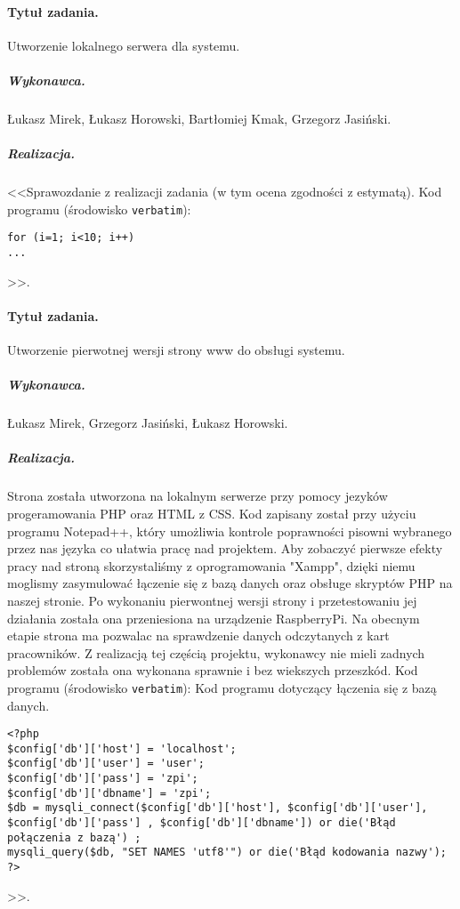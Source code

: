 \documentclass[a4paper]{article}
\begin{document}
\paragraph{Tytuł zadania.} Utworzenie lokalnego serwera dla systemu.
\subparagraph{Wykonawca.} Łukasz Mirek, Łukasz Horowski, Bartłomiej Kmak, Grzegorz Jasiński.
\subparagraph{Realizacja.} <<Sprawozdanie z realizacji zadania (w tym ocena zgodności z estymatą). Kod programu (środowisko \texttt{verbatim}): \begin{verbatim}
for (i=1; i<10; i++)
...
\end{verbatim}>>.
 
\paragraph{Tytuł zadania.} Utworzenie pierwotnej wersji strony www do obsługi systemu.
\subparagraph{Wykonawca.} Łukasz Mirek, Grzegorz Jasiński, Łukasz Horowski.
\subparagraph{Realizacja.} Strona została utworzona na lokalnym serwerze przy pomocy jezyków progeramowania PHP oraz HTML z CSS. Kod zapisany został przy użyciu programu Notepad++, który umożliwia kontrole poprawności pisowni wybranego przez nas języka co ułatwia pracę nad projektem. Aby zobaczyć pierwsze efekty pracy nad stroną skorzystaliśmy z oprogramowania "Xampp", dzięki niemu moglismy zasymulować łączenie się z bazą danych oraz obsługe skryptów PHP na naszej stronie. Po wykonaniu pierwontnej wersji strony i przetestowaniu jej działania została ona przeniesiona na urządzenie RaspberryPi. Na obecnym etapie strona ma pozwalac na sprawdzenie danych odczytanych z kart pracowników. Z realizacją tej częścią projektu, wykonawcy nie mieli zadnych problemów została ona wykonana sprawnie i bez wiekszych przeszkód.  
Kod programu (środowisko \texttt{verbatim}): 
Kod programu dotyczący łączenia się z bazą danych.
\begin{verbatim}
<?php
$config['db']['host'] = 'localhost';
$config['db']['user'] = 'user';
$config['db']['pass'] = 'zpi';
$config['db']['dbname'] = 'zpi';
$db = mysqli_connect($config['db']['host'], $config['db']['user'], $config['db']['pass'] , $config['db']['dbname']) or die('Błąd połączenia z bazą') ;
mysqli_query($db, "SET NAMES 'utf8'") or die('Błąd kodowania nazwy');
?>
\end{verbatim}>>.
\end{document}
